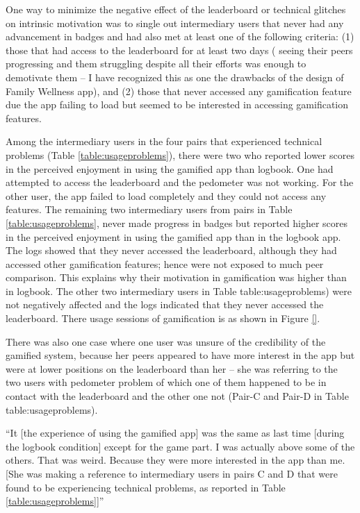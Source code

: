 One way to minimize the negative effect of the leaderboard or technical glitches on intrinsic motivation was to single out intermediary users that never had any advancement in badges and had also met at least one of the following criteria: (1) those that had access to the leaderboard for at least two days ( seeing their peers progressing and them struggling despite all their efforts was enough to demotivate them -- I have recognized this as one the drawbacks of the design of Family Wellness app), and (2) those that never accessed any gamification feature due the app failing to load but seemed to be interested in accessing gamification features.  

Among the intermediary users in the four pairs that experienced technical problems (Table \ref{table:usageproblems}), there were two who reported lower scores in the perceived enjoyment in using the gamified app than logbook. One had attempted to access the leaderboard and the pedometer was not working. For the other user, the app failed to load completely and they could not access any features. The remaining two intermediary users from pairs in Table \ref{table:usageproblems}, never made progress in badges but reported higher scores in the perceived enjoyment in using the gamified app than in the logbook app. The logs showed that they never accessed the leaderboard, although they had accessed other gamification features; hence were not exposed to much peer comparison. This explains why their motivation in gamification was higher than in logbook. The other two intermediary users in Table {table:usageproblems}) were not negatively affected and the logs indicated that they never accessed the leaderboard. There usage sessions of gamification is as shown in Figure \ref{}.     

There was also one case where one user was unsure of the credibility of the gamified system, because her peers appeared to have more interest in the app but were at lower positions on the leaderboard than her -- she was referring to the two users with pedometer problem of which one of them happened to be in contact with the leaderboard and the other one not (Pair-C and Pair-D in Table {table:usageproblems}). 

 {``It [the experience of using the gamified app] was the same as last time [during the logbook condition] except for the game part. I was actually above some of the others. That was weird. Because they were more interested in the app than me. [She was making a reference to intermediary users in pairs C and D that were found to be experiencing technical problems, as reported in Table \ref{table:usageproblems}]''} 


